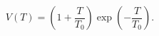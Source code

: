 \begin{equation}\label{V3}
V(T)=\left(1+\frac{T}{T_{0}}\right)\exp\left(-\frac{T}{T_{0}}\right).
\end{equation}

